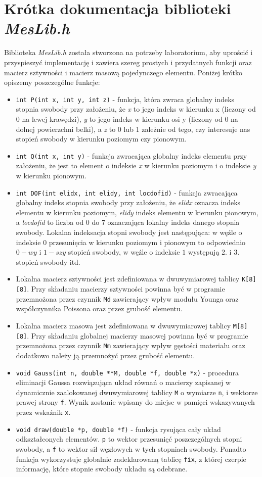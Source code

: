 \documentclass{instrukcja}
\begin{document}
\section{Krótka dokumentacja biblioteki {\it MesLib.h}}
Biblioteka {\it MesLib.h} została stworzona na potrzeby laboratorium, aby uprościć i przyspieszyć implementację i zawiera szereg prostych i przydatnych funkcji oraz macierz sztywności i macierz masową pojedynczego elementu. Poniżej krótko opiszemy poszczególne funkcje:
\begin{itemize}
\item {\tt int P(int x, int y, int z)} - funkcja, która zwraca globalny indeks stopnia swobody przy założeniu, że {\it x} to jego indeks w kierunku x (liczony od 0 na lewej krawędzi), {\it y} to jego indeks w kierunku osi y (liczony od 0 na dolnej powierzchni belki), a {\it z} to 0 lub 1 zależnie od tego, czy interesuje nas stopień swobody w kierunku poziomym czy pionowym.
\item {\tt int Q(int x, int y)} - funkcja zwracająca globalny indeks elementu przy założeniu, że jest to element o indeksie {\it x} w kierunku poziomym i o indeksie {\it y} w kierunku pionowym.
\item {\tt int DOF(int elidx, int elidy, int locdofid)} - funkcja zwracająca globalny indeks stopnia swobody przy założeniu, że {\it elidx} oznacza indeks elementu w kierunku poziomym, {\it elidy} indeks elementu w kierunku pionowym, a {\it locdofid} to liczba od 0 do 7 oznaczająca lokalny indeks danego stopnia swobody. Lokalna indeksacja stopni swobody jest następująca: w węźle o indeksie 0 przesunięcia w kierunku poziomym i pionowym to odpowiednio $0-wy$ i $1-szy$ stopień swobody, w węźle o indeksie $1$ występują 2. i 3. stopień swobody itd.
\item Lokalna macierz sztywności jest zdefiniowana w dwuwymiarowej tablicy {\tt K[8][8]}. Przy składaniu macierzy sztywności powinna być w programie przemnożona przez czynnik {\tt Md} zawierający wpływ modułu Younga oraz współczynnika Poissona oraz przez grubość elementu.
\item Lokalna macierz masowa jest zdefiniowana w dwuwymiarowej tablicy {\tt M[8][8]}. Przy składaniu globalnej macierzy masowej powinna być w programie przemnożona przez czynnik {\tt Mm} zawierający wpływ gęstości materiału oraz dodatkowo należy ją przemnożyć przez grubość elementu.
\item {\tt void Gauss(int n, double **M, double *f, double *x)} - procedura eliminacji Gaussa rozwiązująca układ równań o macierzy zapisanej w dynamicznie zaalokowanej dwuwymiarowej tablicy {\tt M} o wymiarze {\tt n}, i wektorze prawej strony {\tt f}. Wynik zostanie wpisany do miejsc w pamięci wskazywanych przez wskaźnik {\tt *x}.
\item {\tt void draw(double *p, double *f)} - funkcja rysująca cały układ odkształconych elementów. {\tt p} to wektor przesunięć poszczególnych stopni swobody, a {\tt f} to wektor sił węzłowych w tych stopniach swobody. Ponadto funkcja wykorzystuje globalnie zadeklarowaną tablicę {\tt fix}, z której czerpie informację, które stopnie swobody układu są odebrane.
\end{itemize}
\end{document}
